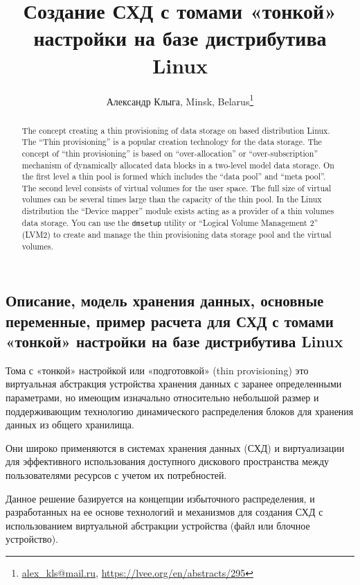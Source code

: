 \documentclass[10pt, a5paper]{article}
\begin{document}
\title{Создание СХД  с томами «тонкой» настройки на базе дистрибутива Linux}
\author{Александр Клыга, Minsk, Belarus\footnote{\url{alex_kls@mail.ru}, \url{https://lvee.org/en/abstracts/295}}}
\maketitle
\begin{abstract}
The concept creating a thin provisioning of data storage on based distribution Linux. The ``Thin provisioning'' is a popular creation technology for the data storage. The concept of ``thin provisioning'' is based on ``over-allocation'' or ``over-subscription'' mechanism of dynamically allocated data blocks in a two-level model data storage. On the first level a thin pool is formed which includes the ``data pool'' and ``meta pool''. The second level consists of virtual volumes for the user space. The full size of virtual volumes can be several times large than the capacity of the thin pool. In the Linux distribution the ``Device mapper'' module exists acting as a provider of a thin volumes data storage. You can use the \verb!dmsetup! utility or ``Logical Volume Management 2'' (LVM2) to create and manage the thin provisioning data storage pool and the virtual volumes.
\end{abstract}
\subsection*{Описание, модель хранения данных, основные переменные, пример расчета для СХД с томами \linebreak «тонкой» настройки на базе дистрибутива Linux}
 
Тома с «тонкой» настройкой \cite{bib1} или «подготовкой» (thin provi\-sioning) это виртуальная абстракция устройства хранения данных с заранее определенными параметрами, но имеющим изначально относительно небольшой размер и поддерживающим технологию динамического распределения блоков для хранения данных из общего хранилища.

Они широко применяются в системах хранения данных (СХД) и виртуализации для эффективного использования доступного дискового пространства между пользователями ресурсов с учетом их потребностей.

Данное решение базируется на концепции избыточного распределения, и  разработанных на ее основе технологий и механизмов для создания СХД с использованием виртуальной абстракции \linebreak устройства (файл или блочное устройство).
\end{document}
